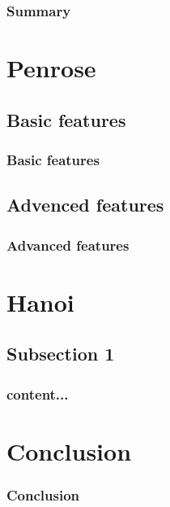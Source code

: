 \documentclass{beamer}
\begin{document}
	\begin{frame}
		\frametitle{Summary}
		\tableofcontents
	\end{frame}
	
	\section{Penrose}
	\subsection*{Basic features}
	\begin{frame}
		\frametitle{Basic features}
	\end{frame}
	
	\subsection*{Advenced features}
	\begin{frame}
		\frametitle{Advanced features}
	\end{frame}
	
	\section{Hanoi}
	\subsection*{Subsection 1}
	\begin{frame}
		\frametitle{content...}
	\end{frame}
	
	\section*{Conclusion}
	\begin{frame}
		\frametitle{Conclusion}
	\end{frame}
\end{document}
